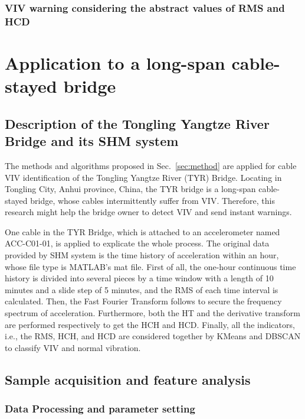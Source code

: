 \documentclass[preprint, 3p, times, compress, 11pt]{elsarticle}
\begin{document}
\subsubsection{VIV warning considering the abstract values of RMS and HCD}

\section{Application to a long-span cable-stayed bridge}
\label{sec:experiment}

\subsection{Description of the Tongling Yangtze River Bridge and its SHM system}

The methods and algorithms proposed in Sec.~\ref{sec:method} are 
applied for cable VIV identification of the Tongling Yangtze River 
(TYR) Bridge. Locating in Tongling City, Anhui province, China, the TYR bridge 
is a long-span cable-stayed bridge, whose cables intermittently suffer 
from VIV. Therefore, this research might help the bridge owner to 
detect VIV and send instant warnings.

One cable in the TYR Bridge, which is attached to an accelerometer 
named ACC-C01-01, is applied to explicate the whole process. The original 
data provided by SHM system is the time history of acceleration within an 
hour, whose file type is MATLAB's mat file. First of all, the one-hour 
continuous time history is divided into several pieces by a time window 
with a length of 10 minutes and a slide step of 5 minutes, and the RMS 
of each time interval is calculated. Then, the Fast Fourier Transform 
follows to secure the frequency spectrum of acceleration. Furthermore, 
both the HT and the derivative transform are performed respectively to 
get the HCH and HCD. Finally, all the indicators, i.e., the RMS, HCH, 
and HCD are considered together by KMeans and DBSCAN to classify VIV and 
normal vibration. 

\subsection{Sample acquisition and feature analysis}

\subsubsection{Data Processing and parameter setting}
\end{document}
